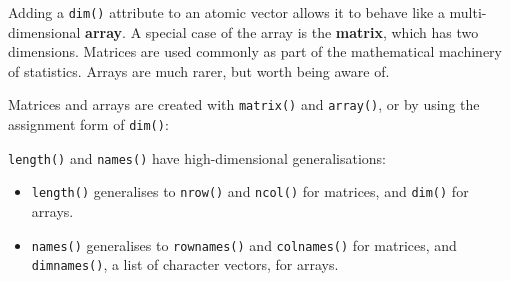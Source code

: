 
Adding a \texttt{dim()} attribute to an atomic vector allows it to
behave like a multi-dimensional \textbf{array}. A special case of the
array is the \textbf{matrix}, which has two dimensions. Matrices are
used commonly as part of the mathematical machinery of statistics.
Arrays are much rarer, but worth being aware of. 

Matrices and arrays are created with \texttt{matrix()} and
\texttt{array()}, or by using the assignment form of \texttt{dim()}:

\begin{Shaded}
\begin{Highlighting}[]
\StringTok{ }\NormalTok{(}\NormalTok{:}\NormalTok{, } \NormalTok{, } \NormalTok{)}
\StringTok{ }\NormalTok{(}\NormalTok{:}\NormalTok{, }\NormalTok{(}\NormalTok{, }\NormalTok{, }\NormalTok{))}

\StringTok{ }\NormalTok{:}
\StringTok{ }\NormalTok{(}\NormalTok{, }\NormalTok{)}
\CommentTok{#>      [,1] [,2]}
\StringTok{ }\NormalTok{(}\NormalTok{, }\NormalTok{)}
\CommentTok{#>      [,1] [,2] [,3]}
\end{Highlighting}
\end{Shaded}

\texttt{length()} and \texttt{names()} have high-dimensional
generalisations:

\begin{itemize}
\item
  \texttt{length()} generalises to \texttt{nrow()} and \texttt{ncol()}
  for matrices, and \texttt{dim()} for arrays. 
   
\item
  \texttt{names()} generalises to \texttt{rownames()} and
  \texttt{colnames()} for matrices, and \texttt{dimnames()}, a list of
  character vectors, for arrays.  
\end{itemize}

